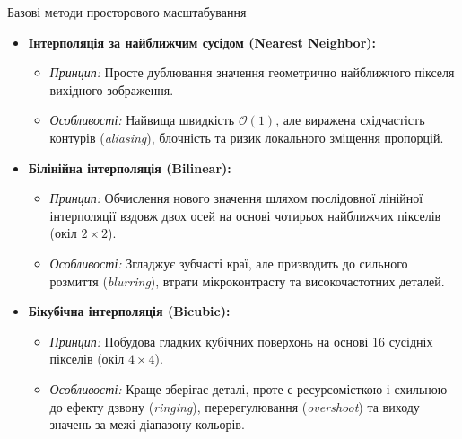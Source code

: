 \documentclass[11pt, aspectratio=169]{beamer}
\begin{document}
	\begin{frame}{Базові методи просторового масштабування}
		\begin{itemize}
			\item \textbf{Інтерполяція за найближчим сусідом (Nearest Neighbor):} 
			\begin{itemize}
				\item \textit{Принцип:} Просте дублювання значення геометрично найближчого пікселя вихідного зображення.
				\item \textit{Особливості:} Найвища швидкість $\mathcal{O}(1)$, але виражена східчастість контурів (\textit{aliasing}), блочність та ризик локального зміщення пропорцій.
			\end{itemize}
			
			\vspace{0.3cm}
			\item \textbf{Білінійна інтерполяція (Bilinear):}
			\begin{itemize}
				\item \textit{Принцип:} Обчислення нового значення шляхом послідовної лінійної інтерполяції вздовж двох осей на основі чотирьох найближчих пікселів (окіл $2 \times 2$).
				\item \textit{Особливості:} Згладжує зубчасті краї, але призводить до сильного розмиття (\textit{blurring}), втрати мікроконтрасту та високочастотних деталей.
			\end{itemize}
			
			\vspace{0.3cm}
			\item \textbf{Бікубічна інтерполяція (Bicubic):}
			\begin{itemize}
				\item \textit{Принцип:} Побудова гладких кубічних поверхонь на основі 16 сусідніх пікселів (окіл $4 \times 4$).
				\item \textit{Особливості:} Краще зберігає деталі, проте є ресурсомісткою і схильною до ефекту дзвону (\textit{ringing}), перерегулювання (\textit{overshoot}) та виходу значень за межі діапазону кольорів.
			\end{itemize}
		\end{itemize}
	\end{frame}
\end{document}
